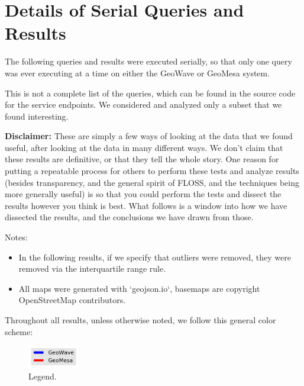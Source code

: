 \section{Details of Serial Queries and Results}
\label{appendix:queries}

The following queries and results were executed serially, so that only one query was ever executing at a time on either the GeoWave or GeoMesa system.

This is not a complete list of the queries, which can be found in the source code for the service endpoints.
We considered and analyzed only a subset that we found interesting.

{\bf Disclaimer: }
These are simply a few ways of looking at the data that we found useful, after looking at the data in many different ways. We don't claim that these results are definitive, or that they tell the whole story.
One reason for putting a repeatable process for others to perform these tests and analyze results
(besides transparency, and the general spirit of FLOSS, and the techniques being more generally useful)
is so that you could perform the tests and dissect the results however you think is best.
What follows is a window into how we have dissected the results, and the conclusions we have drawn from those.

Notes:
\begin{itemize}
\item In the following results, if we specify that outliers were removed, they were removed via the interquartile range rule.
\item All maps were generated with `geojson.io`, basemaps are copyright OpenStreetMap contributors.
\end{itemize}

Throughout all results, unless otherwise noted, we follow this general color scheme:


\begin{figure}[h!tb]
  \centering
  \includegraphics[width=0.20\textwidth]{../docs/img/legend.png}
  \caption{Legend.}
  \label{legend}
\end{figure}

